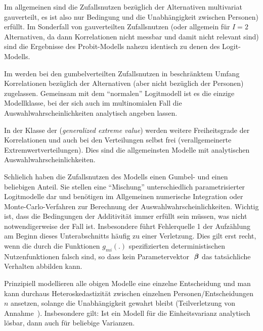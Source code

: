 \item Im allgemeinen  sind die Zufallsnutzen
  bez\"uglich der Alternativen multivariat gau\3verteilt, es ist also nur
  Bedingung  und die
  Unabh\"angigkeit 
  zwischen Personen) erf\"ullt. Im Sonderfall von
   gau\3verteilten Zufallsnutzen (oder  allgemein f\"ur $I=2$
  Alternativen, da dann Korrelationen nicht messbar und damit nicht
  relevant sind) sind die Ergebnisse des Probit-Modells nahezu
  identisch zu denen des Logit-Modells. 

\item Im  werden bei den gumbelverteilten
  Zufallsnutzen in be\-schr\"ank\-tem Umfang
  Korrelationen bez\"uglich der Alternativen (aber nicht bez\"uglich
  der Personen) zugelassen. Gemeinsam mit dem ``normalen'' Logitmodell
  ist es die einzige Modellklasse, bei der sich auch im multinomialen
  Fall die Auswahlwahrscheinlichkeiten analytisch angeben lassen. 

\item In der Klasse der  (\textit{generalized
  extreme value}) werden weitere Freiheitsgrade der Korrelationen
  und auch bei den Verteilungen selbst frei (verallgemeinerte
  Extremwertverteilungen). Dies sind die allgemeinsten Modelle mit
  analytischen Auswahlwahrscheinlichkeiten.

\item Schlie\3lich haben die Zufallsnutzen des 
  Modells einen  Gumbel- und einen beliebigen Anteil. Sie
  stellen eine ``Mischung'' unterschiedlich parametrisierter
  Logitmodelle dar und ben\"otigen im Allgemeinen numerische
  Integration oder Monte-Carlo-Verfahren zur Berechnung der Auswahlwahrscheinlichkeiten.
\ei
%
Wichtig ist, dass die Bedingungen der Additivit\"at
 immer erf\"ullt 
sein m\"ussen, was  nicht notwendigerweise der Fall ist.
Insbesondere f\"uhrt 
Fehlerquelle 1 der Aufz\"ahlung am Beginn dieses Unterabschnitts 
h\"aufig  zu einer
Verletzung. Dies gilt erst recht, wenn die durch die Funktionen $g_{mi}(.)$ 
spezifizierten deterministischen Nutzenfunktionen  falsch sind, so dass
kein Parametervektor  ${\mbox{ \boldmath {$\beta$}}}$ das tats\"achliche Verhalten abbilden
kann.

Prinzipiell modellieren alle obigen Modelle eine einzelne
Entscheidung und man kann durchaus Heteroskedastizit\"at zwischen
einzelnen Personen/Entscheidungen $n$ ansetzen, solange die
Unabh\"angigkeit gewahrt bleibt (Teilverletzung von
Annahme~). Insbesondere gilt: Ist ein Modell f\"ur die
Einheitsvarianz analytisch l\"osbar, dann auch f\"ur beliebige
Varianzen. 


